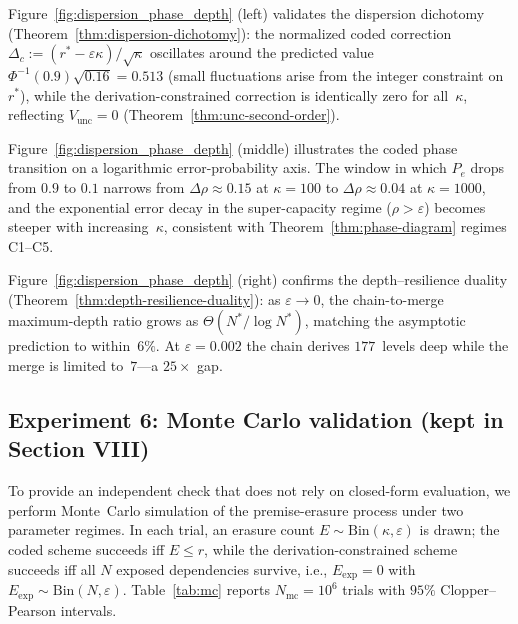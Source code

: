 \documentclass[journal]{IEEEtran}
\numberwithin{equation}{section}
\begin{document}
Figure~\ref{fig:dispersion_phase_depth} (left) validates the
dispersion dichotomy
(Theorem~\ref{thm:dispersion-dichotomy}): the normalized coded
correction
\(\Delta_c:=(r^*-\varepsilon\kappa)/\sqrt\kappa\) oscillates
around the predicted value
\(\Phi^{-1}(0.9)\sqrt{0.16}=0.513\)
(small fluctuations arise from the integer constraint on~\(r^*\)),
while the derivation-constrained correction is identically zero
for all~\(\kappa\), reflecting \(V_{\mathrm{unc}}=0\)
(Theorem~\ref{thm:unc-second-order}).

Figure~\ref{fig:dispersion_phase_depth} (middle) illustrates the
coded phase transition on a logarithmic error-probability axis.
The window in which \(P_e\) drops from \(0.9\) to \(0.1\) narrows
from \(\Delta\rho\approx 0.15\) at \(\kappa=100\) to
\(\Delta\rho\approx 0.04\) at \(\kappa=1000\), and the exponential
error decay in the super-capacity regime (\(\rho>\varepsilon\))
becomes steeper with increasing~\(\kappa\), consistent with
Theorem~\ref{thm:phase-diagram} regimes C1--C5.

Figure~\ref{fig:dispersion_phase_depth} (right) confirms the
depth--resilience duality
(Theorem~\ref{thm:depth-resilience-duality}): as
\(\varepsilon\to 0\), the chain-to-merge maximum-depth ratio grows
as \(\Theta(N^*/\log N^*)\), matching the asymptotic prediction to
within~\(6\%\).
At \(\varepsilon=0.002\) the chain derives \(177\)~levels deep
while the merge is limited to~\(7\)---a \(25\times\) gap.

\subsection{Experiment 6: Monte Carlo validation (kept in Section VIII)}
\label{subsec:exp-mc}

To provide an independent check that does not rely on closed-form evaluation,
we perform Monte~Carlo simulation of the premise-erasure process under two parameter regimes.
In each trial, an erasure count \(E\sim\mathrm{Bin}(\kappa,\varepsilon)\) is drawn; the coded
scheme succeeds iff \(E\le r\), while the derivation-constrained scheme succeeds iff all \(N\)
exposed dependencies survive, i.e., \(E_{\mathrm{exp}}=0\) with \(E_{\mathrm{exp}}\sim\mathrm{Bin}(N,\varepsilon)\).
Table~\ref{tab:mc} reports \(N_{\mathrm{mc}}=10^6\) trials with \(95\%\) Clopper--Pearson intervals.
\end{document}
